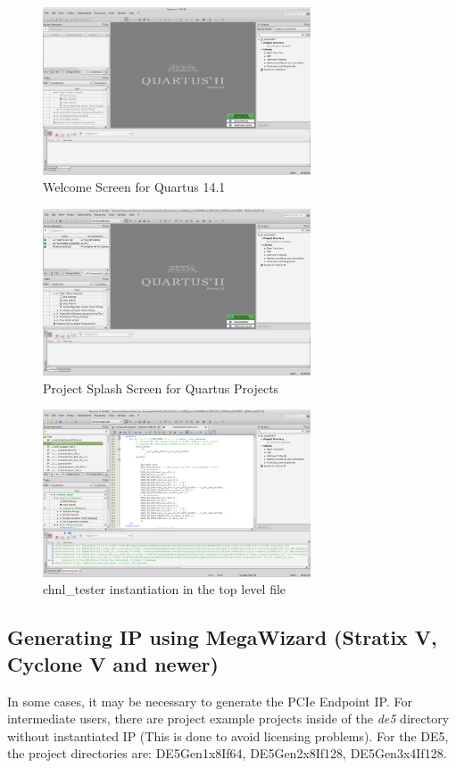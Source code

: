 \documentclass{refrep}
\newcommand{\QuartusVer}{14.1}
\newcommand{\Directory}[1]{\textit{#1}}
\begin{document}
\begin{figure}
  \includegraphics[width=300px,center]{QuartusWelcomeScreen.png}
  \caption{Welcome Screen for Quartus \QuartusVer}
  \label{Fig:Quartus:WelcomeScreen}
\end{figure}
\begin{figure}
  \includegraphics[width=300px,center]{IPCompileOpenProject.png}
  \caption{Project Splash Screen for Quartus Projects}
  \label{Fig:Quartus:ExampleDesign:ProjectOpened}
\end{figure}
\begin{figure}
  \includegraphics[width=300px,trim=400 200 300 200, clip=true,center]{QuartusChnlTesterInstantiation.png}
  \caption{chnl\_tester instantiation in the top level file}
  \label{Fig:Quartus:ExampleDesign:chnl_tester}
\end{figure}

\subsection{Generating IP using MegaWizard (Stratix V, Cyclone V and newer)}
\label{Sec:Altera:QsysMegawizard:Megawizard}
In some cases, it may be necessary to generate the PCIe Endpoint IP. For
intermediate users, there are project example projects inside of the
\Directory{de5} directory without instantiated IP (This is done to avoid
licensing problems). For the DE5, the project directories are: DE5Gen1x8If64,
DE5Gen2x8If128, DE5Gen3x4If128.
\end{document}
